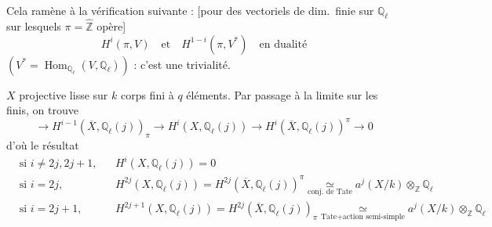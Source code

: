 \documentclass[11pt,a4paper]{article}
\begin{document}
Cela ramène à la vérification suivante : [pour des vectoriels
de dim.\ finie sur $\mathbb{Q}_{\ell}$ sur lesquels
$\pi = \widehat{\mathbb{Z}}$ opère]
\[
  H^{i}(\pi, V) \quad \text{et} \quad H^{1-i}(\pi, V^{*}) \quad \text{en dualité}
\]
$(V^{*} = \operatorname{Hom}_{\mathbb{Q}_{\ell}}(V, \mathbb{Q}_{\ell}))$ : c'est
une trivialité.

$X$ projective lisse  sur $k$ corps fini à $q$ éléments.
Par passage à la limite sur les   finis, on trouve
\[
  \longrightarrow H^{i-1}(\overline{X}, \mathbb{Q}_{\ell}(j))_{\pi} \longrightarrow H^{i}(X, \mathbb{Q}_{\ell}(j)) \longrightarrow H^{i}(\overline{X}, \mathbb{Q}_{\ell}(j))^{\pi} \longrightarrow 0
\]
d'où le résultat
\[
  \begin{aligned}
    &\text{si } i \neq 2j, 2j+1, && H^{i}(X, \mathbb{Q}_{\ell}(j)) = 0 \\
    &\text{si } i = 2j, && H^{2j}(X, \mathbb{Q}_{\ell}(j)) = H^{2j}(\overline{X}, \mathbb{Q}_{\ell}(j))^{\pi} \underset{\text{conj.\ de Tate}}{\simeq} a^{j}(X/k) \otimes_{\mathbb{Z}} \mathbb{Q}_{\ell} \\
    &\text{si } i = 2j+1, && H^{2j+1}(X, \mathbb{Q}_{\ell}(j)) = H^{2j}(\overline{X}, \mathbb{Q}_{\ell}(j))_{\pi} \underset{\text{Tate} + \text{action semi-simple}}{\simeq} a^{j}(X/k) \otimes_{\mathbb{Z}} \mathbb{Q}_{\ell}
  \end{aligned}
\]
\end{document}
